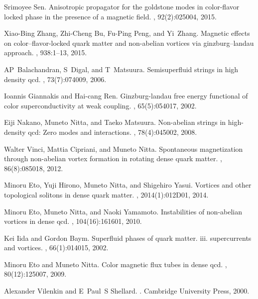 \documentclass[12pt]{article}
\begin{document}
\begin{thebibliography}{99}
Srimoyee Sen.
\newblock Anisotropic propagator for the goldstone modes in color-flavor locked
  phase in the presence of a magnetic field.
, 92(2):025004, 2015.

Xiao-Bing Zhang, Zhi-Cheng Bu, Fu-Ping Peng, and Yi~Zhang.
\newblock Magnetic effects on color--flavor-locked quark matter and non-abelian
  vortices via ginzburg--landau approach.
, 938:1--13, 2015.

AP~Balachandran, S~Digal, and T~Matsuura.
\newblock Semisuperfluid strings in high density qcd.
, 73(7):074009, 2006.

Ioannis Giannakis and Hai-cang Ren.
\newblock Ginzburg-landau free energy functional of color superconductivity at
  weak coupling.
, 65(5):054017, 2002.

Eiji Nakano, Muneto Nitta, and Taeko Matsuura.
\newblock Non-abelian strings in high-density qcd: Zero modes and interactions.
, 78(4):045002, 2008.

Walter Vinci, Mattia Cipriani, and Muneto Nitta.
\newblock Spontaneous magnetization through non-abelian vortex formation in
  rotating dense quark matter.
, 86(8):085018, 2012.

Minoru Eto, Yuji Hirono, Muneto Nitta, and Shigehiro Yasui.
\newblock Vortices and other topological solitons in dense quark matter.
,
  2014(1):012D01, 2014.

Minoru Eto, Muneto Nitta, and Naoki Yamamoto.
\newblock Instabilities of non-abelian vortices in dense qcd.
, 104(16):161601, 2010.

Kei Iida and Gordon Baym.
\newblock Superfluid phases of quark matter. iii. supercurrents and vortices.
, 66(1):014015, 2002.



Minoru Eto and Muneto Nitta.
\newblock Color magnetic flux tubes in dense qcd.
, 80(12):125007, 2009.

Alexander Vilenkin and E~Paul~S Shellard.
.
\newblock Cambridge University Press, 2000.


\end{thebibliography}
\end{document}
